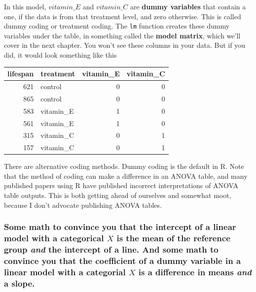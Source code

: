 \documentclass[]{book}
\begin{document}
In this model, \(vitamin\_E\) and \(vitamin\_C\) are \textbf{dummy
variables} that contain a one, if the data is from that treatment level,
and zero otherwise. This is called dummy coding or treatment coding. The
\texttt{lm} function creates these dummy variables under the table, in
something called the \textbf{model matrix}, which we'll cover in the
next chapter. You won't see these columns in your data. But if you did,
it would look something like this

\begin{tabular}{r|l|r|r}
\hline
lifespan & treatment & vitamin\_E & vitamin\_C\\
\hline
621 & control & 0 & 0\\
\hline
865 & control & 0 & 0\\
\hline
583 & vitamin\_E & 1 & 0\\
\hline
561 & vitamin\_E & 1 & 0\\
\hline
315 & vitamin\_C & 0 & 1\\
\hline
157 & vitamin\_C & 0 & 1\\
\hline
\end{tabular}

There are alternative coding methods. Dummy coding is the default in R.
Note that the method of coding can make a difference in an ANOVA table,
and many published papers using R have published incorrect
interpretations of ANOVA table outputs. This is both getting ahead of
ourselves and somewhat moot, because I don't advocate publishing ANOVA
tables.

\subsubsection{\texorpdfstring{Some math to convince you that the
intercept of a linear model with a categorical \(X\) is the mean of the
reference group \emph{and} the intercept of a line. And some math to
convince you that the coefficient of a dummy variable in a linear model
with a categorial \(X\) is a difference in means \emph{and} a
slope.}{Some math to convince you that the intercept of a linear model with a categorical X is the mean of the reference group and the intercept of a line. And some math to convince you that the coefficient of a dummy variable in a linear model with a categorial X is a difference in means and a slope.}}\label{some-math-to-convince-you-that-the-intercept-of-a-linear-model-with-a-categorical-x-is-the-mean-of-the-reference-group-and-the-intercept-of-a-line.-and-some-math-to-convince-you-that-the-coefficient-of-a-dummy-variable-in-a-linear-model-with-a-categorial-x-is-a-difference-in-means-and-a-slope.}
\end{document}
